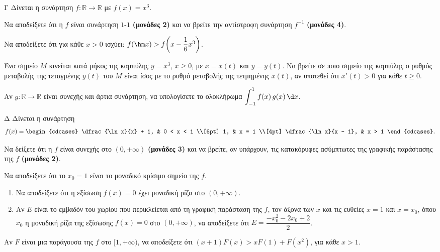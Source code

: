 \begin{thema}{Γ}
Δίνεται η συνάρτηση $f : \mathbb{R} \to \mathbb{R}$ με $f(x) = x^3$.
\begin{erwthma}
    \item Να αποδείξετε ότι η $f$ είναι συνάρτηση $1$-$1$ \textbf{(μονάδες 2)} και να βρείτε την αντίστροφη συνάρτηση $f^{-1}$ \textbf{(μονάδες 4)}. 
    \item Να αποδείξετε ότι για κάθε $x > 0$ ισχύει: $f(\hm x) > f\!\left(x - \dfrac{1}{6}x^3\right)$. 
    \item Ένα σημείο $M$ κινείται κατά μήκος της καμπύλης $y = x^3$, $x \geq 0$, με $x = x(t)$ και $y = y(t)$. Να βρείτε σε ποιο σημείο της καμπύλης ο ρυθμός μεταβολής της τεταγμένης $y(t)$ του $M$ είναι ίσος με το ρυθμό μεταβολής της τετμημένης $x(t)$, αν υποτεθεί ότι $x'(t) > 0$ για κάθε $t \geq 0$. 
    \item Αν $g : \mathbb{R} \to \mathbb{R}$ είναι συνεχής και άρτια συνάρτηση, να υπολογίσετε το ολοκλήρωμα $\displaystyle\int_{-1}^{1} f(x)\,g(x)\,\d x$. 
\end{erwthma}
\end{thema}
\begin{thema}{Δ}
Δίνεται η συνάρτηση
\[
f(x) = \begin{cdcases}
\dfrac{\ln x}{x} + 1, & 0 < x < 1 \\[6pt]
1, & x = 1 \\[4pt]
\dfrac{\ln x}{x - 1}, & x > 1
\end{cdcases}.
\]
\begin{erwthma}
    \item Να δείξετε ότι η $f$ είναι συνεχής στο $(0, +\infty)$ \textbf{(μονάδες 3)} και να βρείτε, αν υπάρχουν, τις κατακόρυφες ασύμπτωτες της γραφικής παράστασης της $f$ \textbf{(μονάδες 2)}. 
    \item Να αποδείξετε ότι το $x_0 = 1$ είναι το μοναδικό κρίσιμο σημείο της $f$. 
    \item
    \begin{enumerate}[label=\roman*)]
        \item Να αποδείξετε ότι η εξίσωση $f(x) = 0$ έχει μοναδική ρίζα στο $(0, +\infty)$. 
        \item Αν $E$ είναι το εμβαδόν του χωρίου που περικλείεται από τη γραφική παράσταση της $f$, τον άξονα των $x$ και τις ευθείες $x = 1$ και $x = x_0$, όπου $x_0$ η μοναδική ρίζα της εξίσωσης $f(x) = 0$ στο $(0, +\infty)$, να αποδείξετε ότι $E = \dfrac{-x_0^2 - 2x_0 + 2}{2}$. 
    \end{enumerate}
    \item Αν $F$ είναι μια παράγουσα της $f$ στο $[1, +\infty)$, να αποδείξετε ότι $(x+1)F(x) > xF(1) + F(x^2)$, για κάθε $x > 1$. 
\end{erwthma}
\end{thema}



